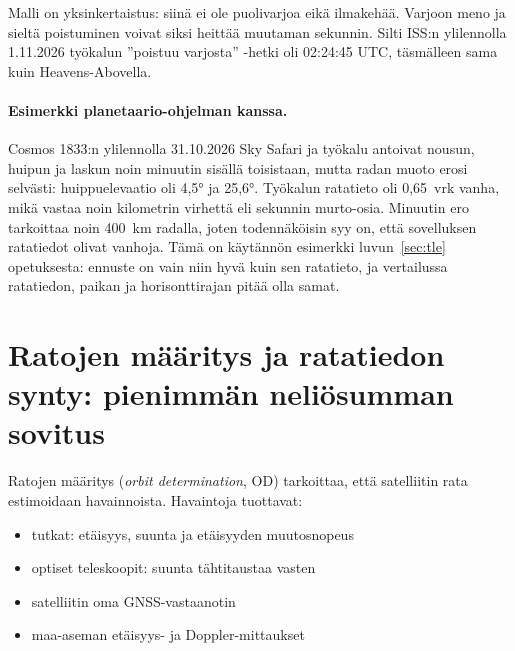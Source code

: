 \documentclass[a4paper,11pt]{article}
\begin{document}
Malli on yksinkertaistus: siinä ei ole puolivarjoa eikä ilmakehää. Varjoon meno ja sieltä poistuminen voivat siksi heittää muutaman sekunnin. Silti ISS:n ylilennolla 1.11.2026 työkalun ”poistuu varjosta” -hetki oli 02:24:45 UTC, täsmälleen sama kuin Heavens-Abovella.

\paragraph{Esimerkki planetaario-ohjelman kanssa.} Cosmos 1833:n ylilennolla 31.10.2026 Sky Safari ja työkalu antoivat nousun, huipun ja laskun noin minuutin sisällä toisistaan, mutta radan muoto erosi selvästi: huippuelevaatio oli 4,5° ja 25,6°. Työkalun ratatieto oli 0,65~vrk vanha, mikä vastaa noin kilometrin virhettä eli sekunnin murto-osia. Minuutin ero tarkoittaa noin 400~km radalla, joten todennäköisin syy on, että sovelluksen ratatiedot olivat vanhoja. Tämä on käytännön esimerkki luvun~\ref{sec:tle} opetuksesta: ennuste on vain niin hyvä kuin sen ratatieto, ja vertailussa ratatiedon, paikan ja horisonttirajan pitää olla samat.

\section{Ratojen määritys ja ratatiedon synty: pienimmän neliösumman sovitus}\label{sec:od}

Ratojen määritys (\emph{orbit determination}, OD) tarkoittaa, että satelliitin rata estimoidaan havainnoista. Havaintoja tuottavat:
\begin{itemize}
  \item tutkat: etäisyys, suunta ja etäisyyden muutosnopeus
  \item optiset teleskoopit: suunta tähtitaustaa vasten
  \item satelliitin oma GNSS-vastaanotin
  \item maa-aseman etäisyys- ja Doppler-mittaukset
\end{itemize}
\end{document}
